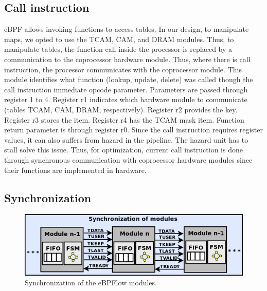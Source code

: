 \subsection{Call instruction}


eBPF allows invoking functions to access tables.
In our design, to manipulate maps, we opted to use the TCAM, CAM, and DRAM modules.
Thus, to manipulate tables, the function call inside the processor is replaced by a communication to the coprocessor hardware module. 
Thus, where there is call instruction, the processor communicates with the coprocessor module.
This module identifies what function (lookup, update, delete) was called though the call instruction immediate opcode parameter. 
Parameters are passed through register 1 to 4.
Register r1 indicates which hardware module to communicate (tables TCAM, CAM, DRAM, respectively).
Register r2 provides the key.
Register r3 stores the item.
Register r4 has the TCAM mask item.
Function return parameter is through register r0.
Since the call instruction requires register values, it can also suffers from hazard in the pipeline. The hazard unit has to stall solve this issue.
Thus, for optimization, current call instruction is done through synchronous communication with coprocessor hardware modules since their functions are implemented in hardware.




\subsection{Synchronization}

\begin{figure}[ht]
\centering
\includegraphics[width=\linewidth]{figures/06_fig04.png}
\caption{Synchronization of the eBPFlow modules.}
\label{fig:06_fig04}
\end{figure}

